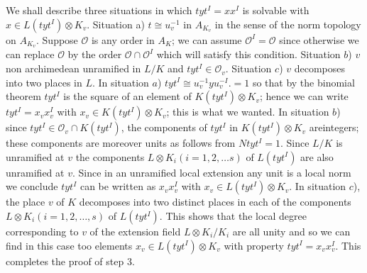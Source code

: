 \begin{step}%
 We shall describe three situations in which
 $tyt^I=xx^I$ is solvable with $x \in L(tyt^I)\otimes K_v$. Situation
 a) $t \cong u^{-1}_v$ in $A_{K_v}$ in the sense of the norm
 topology on $A_{K_v}$. Suppose $\mathscr{O}$ is any order in $A_K$;
 we can assume $\mathscr{O}^I=\mathscr{O}$ since otherwise we can
 replace $\mathscr{O}$ by the order $\mathscr{O} \cap \mathscr{O}^{I}$
 which will satisfy this condition. Situation $b$) $v$ non archimedean
 unramified in $L/K$ and $tyt^I \in \mathscr{O}_v$. Situation $c$) $v$
 decomposes into two places in $L$. In situation $a$) 
 $tyt^I \cong u^{-1}_v yu^{-I}_v.=1$ so that by the binomial theorem
 $tyt^I$ is the square of an element of $K(tyt^I)\otimes K_v$; hence
 we can write $tyt^I=x_vx^I_v$ with $x_v \in K (tyt^I) \otimes K_v$;
 this is what we wanted. In situation $b$) since $tyt^I \in
 \mathscr{O}_v \cap K(tyt^I)$, the components of $tyt^I$ in $K(tyt^I)
 \otimes K_v$ are\pageoriginale integers; these components are
 moreover units as 
 follows from $Ntyt^I=1$. Since $L/K$ is unramified at $v$ the
 components $L \otimes K_i (i=1,2, \ldots s)$ of $L(tyt^I)$ are also 
 unramified at $v$. Since in an unramified local extension any unit is
 a local norm we conclude $tyt^I$ can be written as $x_vx_v^I$ with
 $x_v \in L(tyt^I) \otimes K_v$. In situation $c$), the place $v$ of
 $K$ decomposes  into two distinct places in each of the components $L
 \otimes K_i (i=1,2, \ldots ,s)$ of $L(tyt^I)$. This shows that the
 local degree corresponding to $v$ of the extension field $L \otimes
 K_i /K_i$ are all unity and so we can find in this case too elements
 $x_v \in L(tyt^I) \otimes K_v$ with property $tyt^I=x_vx_v^I$. This
 completes the proof of step 3. 
\end{step}

